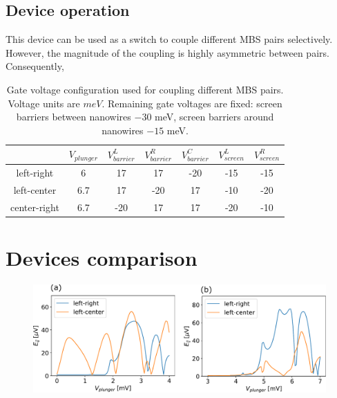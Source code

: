 \subsection{Device operation}

This device can be used as a switch to couple different MBS pairs selectively.
However, the magnitude of the coupling is highly asymmetric between pairs.
Consequently, 

\begin{table}[h!]
\centering
\begin{tabular}{||c || c c c c c c ||} 
 \hline
& $V_{plunger}$ & $V_{barrier}^L$ & $V_{barrier}^R$ & $V_{barrier}^C$ & $V_{screen}^L$ & $V_{screen}^R$ \\
 \hline\hline
 left-right & 6 & 17 & 17 & -20 & -15 & -15\\ 
 \hline
 left-center & 6.7 & 17 & -20 & 17 & -10 & -20\\ 
 \hline
 center-right & 6.7 & -20 & 17 & 17 & -20 & -10\\ 
 \hline
 \hline
\end{tabular}
\caption{Gate voltage configuration used for coupling different MBS pairs. Voltage units are $meV$. Remaining gate voltages are fixed: screen barriers between nanowires $-30$ meV, screen barriers around nanowires $-15$ meV.}
\label{table:gate_voltages}
\end{table}


\section{Devices comparison}

\begin{figure}[h!]
\centering
  \includegraphics[width=0.8\linewidth]{figures/device_couplings.pdf}
  \caption{}
  \label{fig:device_2_screens}
\end{figure}

